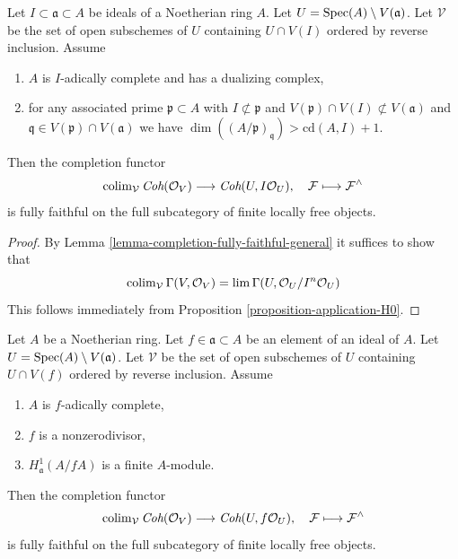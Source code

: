 \begin{lemma}
\label{lemma-fully-faithful-general}
Let $I \subset \mathfrak a \subset A$ be ideals of a Noetherian ring $A$.
Let $U = \mathop{\mathrm{Spec}}(A) \setminus V(\mathfrak a)$. Let $\mathcal{V}$ be
the set of open subschemes of $U$ containing $U \cap V(I)$
ordered by reverse inclusion. Assume
\begin{enumerate}
\item $A$ is $I$-adically complete and has a dualizing complex,
\item for any associated prime
$\mathfrak p \subset A$ with
$I \not \subset \mathfrak p$ and
$V(\mathfrak p) \cap V(I) \not \subset V(\mathfrak a)$
and $\mathfrak q \in V(\mathfrak p) \cap V(\mathfrak a)$ we have
$\dim((A/\mathfrak p)_\mathfrak q) > \text{cd}(A, I) + 1$.
\end{enumerate}
Then the completion functor
$$
\mathop{\mathrm{colim}}\nolimits_\mathcal{V} \textit{Coh}(\mathcal{O}_V)
\longrightarrow
\textit{Coh}(U, I\mathcal{O}_U),
\quad
\mathcal{F} \longmapsto \mathcal{F}^\wedge
$$
is fully faithful on the full subcategory of
finite locally free objects.
\end{lemma}

\begin{proof}
By Lemma \ref{lemma-completion-fully-faithful-general}
it suffices to show that
$$
\mathop{\mathrm{colim}}\nolimits_\mathcal{V} \Gamma(V, \mathcal{O}_V) =
\mathop{\mathrm{lim}}\nolimits \Gamma(U, \mathcal{O}_U/I^n\mathcal{O}_U)
$$
This follows immediately from Proposition \ref{proposition-application-H0}.
\end{proof}

\begin{lemma}
\label{lemma-fully-faithful-general-alternative}
Let $A$ be a Noetherian ring. Let $f \in \mathfrak a \subset A$
be an element of an ideal of $A$. Let $U = \mathop{\mathrm{Spec}}(A) \setminus V(\mathfrak a)$.
Let $\mathcal{V}$ be the set of open subschemes of $U$ containing $U \cap V(f)$
ordered by reverse inclusion. Assume
\begin{enumerate}
\item $A$ is $f$-adically complete,
\item $f$ is a nonzerodivisor,
\item $H^1_\mathfrak a(A/fA)$ is a finite $A$-module.
\end{enumerate}
Then the completion functor
$$
\mathop{\mathrm{colim}}\nolimits_\mathcal{V} \textit{Coh}(\mathcal{O}_V)
\longrightarrow
\textit{Coh}(U, f\mathcal{O}_U),
\quad
\mathcal{F} \longmapsto \mathcal{F}^\wedge
$$
is fully faithful on the full subcategory of finite locally free objects.
\end{lemma}

